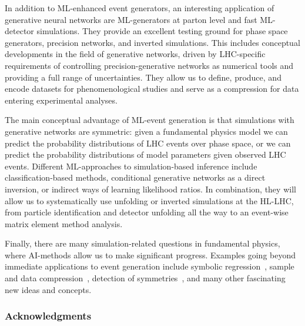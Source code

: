 \documentclass[submission,Phys]{SciPost}
\begin{document}
In addition to ML-enhanced event generators, an interesting application of generative neural networks are ML-generators at parton level and fast ML-detector simulations. They provide an excellent testing ground for phase space generators, precision networks, and inverted simulations. This includes conceptual developments in the field of generative networks, driven by LHC-specific requirements of controlling precision-generative networks as numerical tools and providing a full range of uncertainties. They allow us to define, produce, and encode datasets for phenomenological studies and serve as a compression for data entering experimental analyses.

The main conceptual advantage of ML-event generation is that simulations with generative networks are symmetric: given a fundamental physics model we can predict the probability distributions of LHC events over phase space, or we can predict the probability distributions of model parameters given observed LHC events. Different ML-approaches to simulation-based inference include classification-based methods, conditional generative networks as a direct inversion, or indirect ways of learning likelihood ratios. In combination, they will allow us to systematically use unfolding or inverted simulations at the HL-LHC, from particle identification and detector unfolding all the way to an event-wise matrix element method analysis.

Finally, there are many simulation-related questions in fundamental physics, where AI-methods allow us to make significant progress. Examples going beyond immediate applications to event generation include symbolic regression~\cite{Butter:2021rvz}, sample and data compression~\cite{Carrazza:2021hny,Butter:2022lkf}, detection of symmetries~\cite{Betzler:2020rfg,Krippendorf:2020gny,Barenboim:2021vzh,Desai:2021wbb}, and many other fascinating new ideas and concepts.

\subsubsection*{Acknowledgments}
\end{document}
